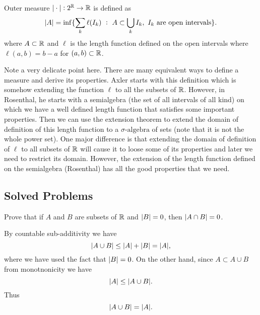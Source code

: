 \begin{definition}
	Outer measure $ |\cdot|: 2^{\mathbb{R}} \to \mathbb{R} $ is defined as
	\[ |A| = \inf\{\sum_{k}\ell(I_k)\ :\ A \subset \bigcup_k I_k,\ I_k\text{ are open intervals}\}. \]
	where $ A \subset \mathbb{R} $ and $ \ell $ is the length function defined on the open intervals where $ \ell(a,b) = b-a $ for $ (a,b)\subset \mathbb{R} $.
\end{definition}
\begin{remark}
	Note a very delicate point here. There are many equivalent ways to define a measure and derive its properties. Axler starts with this definition which is somehow extending the function $ \ell $ to all the subsets of $ \mathbb{R} $. However, in Rosenthal, he starts with a semialgebra (the set of all intervals of all kind) on which we have a well defined length function that satisfies some important properties. Then we can use the extension theorem to extend the domain of definition of this length function to a $ \sigma\text{-algebra} $ of sets (note that it is not the whole power set). One major difference is that extending the domain of definition of $ \ell $ to all subsets of $ \mathbb{R} $ will cause it to loose some of its properties and later we need to restrict its domain. However, the extension of the length function defined on the semialgebra (Rosenthal) has all the good properties that we need.
\end{remark}
 
\subsection{Solved Problems}


\begin{problem}
	Prove that if $ A $ and $ B $ are subsets of $ \mathbb{R} $ and $ |B| = 0 $, then $ |A \cap B| = 0 $.
\end{problem}
\begin{solution}
	By countable sub-additivity we have
	\[ |A \cup B| \leq |A| + |B| = |A|, \]
	where we have used the fact that $ |B| = 0 $. On the other hand, since $ A \subset A \cup B $ from monotnonicity we have
	\[ |A| \leq |A \cup B|. \]
	Thus 
	\[ |A \cup B| = |A|. \]
\end{solution}